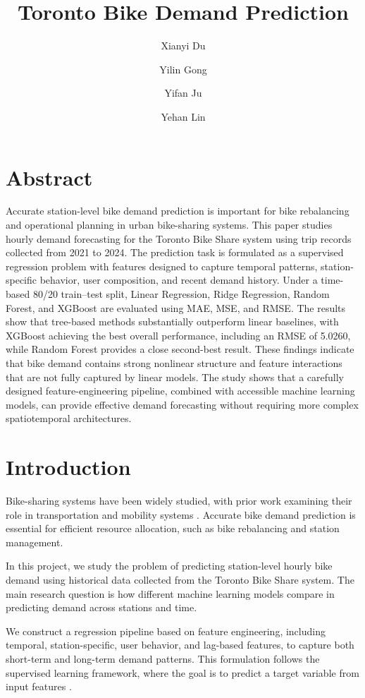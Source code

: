 \documentclass[11pt]{article}
\title{\vspace{-1em}\textbf{Toronto Bike Demand Prediction}\vspace{-0.5em}}
\author{
Xianyi Du \and
Yilin Gong \and
Yifan Ju \and
Yehan Lin
}
\date{}
\begin{document}
\maketitle
\vspace{-1em}

\section*{Abstract}
Accurate station-level bike demand prediction is important for bike rebalancing and operational planning in urban bike-sharing systems. This paper studies hourly demand forecasting for the Toronto Bike Share system using trip records collected from 2021 to 2024. The prediction task is formulated as a supervised regression problem with features designed to capture temporal patterns, station-specific behavior, user composition, and recent demand history. Under a time-based 80/20 train--test split, Linear Regression, Ridge Regression, Random Forest, and XGBoost are evaluated using MAE, MSE, and RMSE. The results show that tree-based methods substantially outperform linear baselines, with XGBoost achieving the best overall performance, including an RMSE of 5.0260, while Random Forest provides a close second-best result. These findings indicate that bike demand contains strong nonlinear structure and feature interactions that are not fully captured by linear models. The study shows that a carefully designed feature-engineering pipeline, combined with accessible machine learning models, can provide effective demand forecasting without requiring more complex spatiotemporal architectures.

\section*{Introduction}

Bike-sharing systems have been widely studied, with prior work examining their role in transportation and mobility systems \cite{fishman2013bike}. Accurate bike demand prediction is essential for efficient resource allocation, such as bike rebalancing and station management.

In this project, we study the problem of predicting station-level hourly bike demand using historical data collected from the Toronto Bike Share system. The main research question is how different machine learning models compare in predicting demand across stations and time.

We construct a regression pipeline based on feature engineering, including temporal, station-specific, user behavior, and lag-based features, to capture both short-term and long-term demand patterns. This formulation follows the supervised learning framework, where the goal is to predict a target variable from input features \cite{hastie2009elements}.
\end{document}
